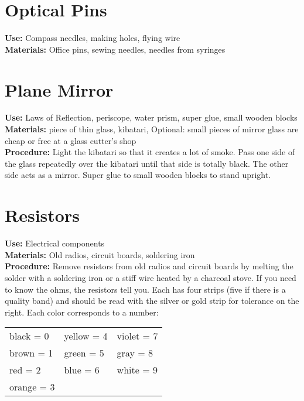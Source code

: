 \section{Optical Pins}
\vspace{-10pt}
\textbf{Use:} Compass needles, making holes, flying wire\\
\textbf{Materials:} Office pins, sewing needles, needles from syringes

\section{Plane Mirror}
\vspace{-10pt}
\textbf{Use:} Laws of Reflection, periscope, water prism, super glue, small wooden blocks\\
\textbf{Materials:} piece of thin glass, kibatari, Optional: small pieces of mirror glass are cheap or free at a glass cutter's shop\\
\textbf{Procedure:} Light the kibatari so that it creates a lot of smoke.  Pass one side of the glass repeatedly over the kibatari until that side is totally black.  The other side acts as a mirror. Super glue to small wooden blocks to stand upright.

\section{Resistors}
\label{sec:resistors}
\vspace{-10pt}
\textbf{Use:} Electrical components\\
\textbf{Materials:} Old radios, circuit boards, soldering iron\\
\textbf{Procedure:} Remove resistors from old radios and circuit boards by melting the solder with a soldering iron or a stiff wire heated by a charcoal stove. If you need to know the ohms, the resistors tell you. Each has four strips (five if there is a quality band) and should be read with the silver or gold strip for tolerance on the right. Each color corresponds to a number:\\

\begin{tabular}{lll}
black = 0 & yellow = 4 & violet = 7\\
brown = 1 & green = 5 & gray = 8\\
red = 2 & blue = 6 & white = 9\\
orange = 3 & & \\[10pt]
\end{tabular} 

